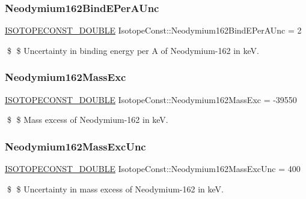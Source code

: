 \subsubsection{\texorpdfstring{Neodymium162\+Bind\+E\+Per\+A\+Unc}{Neodymium162BindEPerAUnc}}
{\footnotesize\ttfamily \mbox{\hyperlink{group___isotope_const-_macros_ga8f45a7272ce02c0b4c65c44636ed719a}{I\+S\+O\+T\+O\+P\+E\+C\+O\+N\+S\+T\+\_\+\+D\+O\+U\+B\+LE}} Isotope\+Const\+::\+Neodymium162\+Bind\+E\+Per\+A\+Unc = 2}

\$ \$ Uncertainty in binding energy per A of Neodymium-\/162 in keV. \mbox{\label{group___isotope_const-_neodymium-_nd162_gae11170e13a18bb8c6502c165400966c9}} 
\subsubsection{\texorpdfstring{Neodymium162\+Mass\+Exc}{Neodymium162MassExc}}
{\footnotesize\ttfamily \mbox{\hyperlink{group___isotope_const-_macros_ga8f45a7272ce02c0b4c65c44636ed719a}{I\+S\+O\+T\+O\+P\+E\+C\+O\+N\+S\+T\+\_\+\+D\+O\+U\+B\+LE}} Isotope\+Const\+::\+Neodymium162\+Mass\+Exc = -\/39550}

\$ \$ Mass excess of Neodymium-\/162 in keV. \mbox{\label{group___isotope_const-_neodymium-_nd162_gab92a3e6bdd35ee1390ad40319be98874}} 
\subsubsection{\texorpdfstring{Neodymium162\+Mass\+Exc\+Unc}{Neodymium162MassExcUnc}}
{\footnotesize\ttfamily \mbox{\hyperlink{group___isotope_const-_macros_ga8f45a7272ce02c0b4c65c44636ed719a}{I\+S\+O\+T\+O\+P\+E\+C\+O\+N\+S\+T\+\_\+\+D\+O\+U\+B\+LE}} Isotope\+Const\+::\+Neodymium162\+Mass\+Exc\+Unc = 400}

\$ \$ Uncertainty in mass excess of Neodymium-\/162 in keV. \mbox{\label{group___isotope_const-_neodymium-_nd162_ga2033a93e23453f3324ee4fdf358188d0}} 
